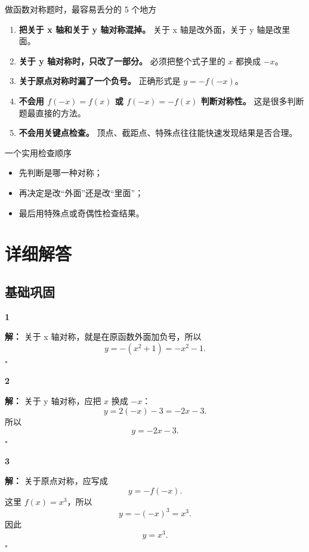 \documentclass[11pt,a4paper,fontset=fandol]{ctexart}
\theoremstyle{formalexample}
\newenvironment{solution}{\par\noindent\textbf{解：}}{\hfill$\square$\par}
\begin{document}
\begin{goalbox}{做函数对称题时，最容易丢分的 5 个地方}
\begin{enumerate}
  \item \textbf{把关于 x 轴和关于 y 轴对称混掉。}  
  关于 x 轴是改外面，关于 y 轴是改里面。

  \item \textbf{关于 y 轴对称时，只改了一部分。}  
  必须把整个式子里的 $x$ 都换成 $-x$。

  \item \textbf{关于原点对称时漏了一个负号。}  
  正确形式是 $y=-f(-x)$。

  \item \textbf{不会用 $f(-x)=f(x)$ 或 $f(-x)=-f(x)$ 判断对称性。}  
  这是很多判断题最直接的方法。

  \item \textbf{不会用关键点检查。}  
  顶点、截距点、特殊点往往能快速发现结果是否合理。
\end{enumerate}
\end{goalbox}

\begin{notebox}{一个实用检查顺序}
\begin{itemize}
  \item 先判断是哪一种对称；
  \item 再决定是改“外面”还是改“里面”；
  \item 最后用特殊点或奇偶性检查结果。
\end{itemize}
\end{notebox}

\newpage
\appendix
\section{详细解答}

\subsection*{基础巩固}

\textbf{1}\begin{solution}
关于 x 轴对称，就是在原函数外面加负号，所以
\[
\boxed{y=-(x^2+1)=-x^2-1}.
\]
\end{solution}

\textbf{2}\begin{solution}
关于 y 轴对称，应把 $x$ 换成 $-x$：
\[
y=2(-x)-3=-2x-3.
\]
所以
\[
\boxed{y=-2x-3}.
\]
\end{solution}

\textbf{3}\begin{solution}
关于原点对称，应写成
\[
y=-f(-x).
\]
这里 $f(x)=x^3$，所以
\[
y=-(-x)^3=x^3.
\]
因此
\[
\boxed{y=x^3}.
\]
\end{solution}
\end{document}
